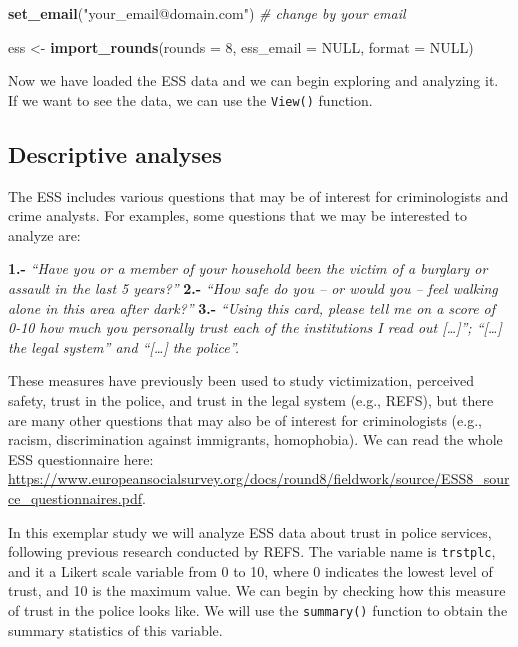 \documentclass[
]{article}
\newenvironment{Shaded}{\begin{snugshade}}{\end{snugshade}}
\newcommand{\CommentTok}[1]{\textcolor[rgb]{0.56,0.35,0.01}{\textit{#1}}}
\newcommand{\DataTypeTok}[1]{\textcolor[rgb]{0.13,0.29,0.53}{#1}}
\newcommand{\DecValTok}[1]{\textcolor[rgb]{0.00,0.00,0.81}{#1}}
\newcommand{\KeywordTok}[1]{\textcolor[rgb]{0.13,0.29,0.53}{\textbf{#1}}}
\newcommand{\NormalTok}[1]{#1}
\newcommand{\OtherTok}[1]{\textcolor[rgb]{0.56,0.35,0.01}{#1}}
\newcommand{\StringTok}[1]{\textcolor[rgb]{0.31,0.60,0.02}{#1}}
\begin{document}
\begin{Shaded}
\begin{Highlighting}[]
\KeywordTok{set_email}\NormalTok{(}\StringTok{"your_email@domain.com"}\NormalTok{) }\CommentTok{# change by your email}

\NormalTok{ess <-}\StringTok{ }\KeywordTok{import_rounds}\NormalTok{(}\DataTypeTok{rounds =} \DecValTok{8}\NormalTok{, }\DataTypeTok{ess_email =} \OtherTok{NULL}\NormalTok{, }\DataTypeTok{format =} \OtherTok{NULL}\NormalTok{)}
\end{Highlighting}
\end{Shaded}

Now we have loaded the ESS data and we can begin exploring and analyzing
it. If we want to see the data, we can use the \texttt{View()} function.

\hypertarget{descriptive-analyses}{%
\subsection{Descriptive analyses}\label{descriptive-analyses}}

The ESS includes various questions that may be of interest for
criminologists and crime analysts. For examples, some questions that we
may be interested to analyze are:

\textbf{1.-} \emph{``Have you or a member of your household been the
victim of a burglary or assault in the last 5 years?''} \textbf{2.-}
\emph{``How safe do you -- or would you -- feel walking alone in this
area after dark?''} \textbf{3.-} \emph{``Using this card, please tell me
on a score of 0-10 how much you personally trust each of the
institutions I read out {[}\ldots{]}''; ``{[}\ldots{]} the legal
system'' and ``{[}\ldots{]} the police''.}

These measures have previously been used to study victimization,
perceived safety, trust in the police, and trust in the legal system
(e.g., REFS), but there are many other questions that may also be of
interest for criminologists (e.g., racism, discrimination against
immigrants, homophobia). We can read the whole ESS questionnaire here:
\url{https://www.europeansocialsurvey.org/docs/round8/fieldwork/source/ESS8_source_questionnaires.pdf}.

In this exemplar study we will analyze ESS data about trust in police
services, following previous research conducted by REFS. The variable
name is \texttt{trstplc}, and it a Likert scale variable from 0 to 10,
where 0 indicates the lowest level of trust, and 10 is the maximum
value. We can begin by checking how this measure of trust in the police
looks like. We will use the \texttt{summary()} function to obtain the
summary statistics of this variable.
\end{document}
